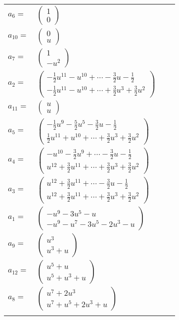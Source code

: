 \documentclass[1p]{elsarticle_modified}
\theoremstyle{definition}
\begin{document}
\begin{tabular}{m{7pt} m{180pt} m{7pt} m{180pt} }
\flushright $a_{6}=$&$\begin{pmatrix}1\\0\end{pmatrix}$ \\
\flushright $a_{10}=$&$\begin{pmatrix}0\\u\end{pmatrix}$ \\
\flushright $a_{7}=$&$\begin{pmatrix}1\\- u^2\end{pmatrix}$ \\
\flushright $a_{2}=$&$\begin{pmatrix}-\frac{1}{2} u^{11}- u^{10}+\cdots-\frac{3}{2} u-\frac{1}{2}\\-\frac{1}{2} u^{11}- u^{10}+\cdots+\frac{3}{2} u^3+\frac{3}{2} u^2\end{pmatrix}$ \\
\flushright $a_{11}=$&$\begin{pmatrix}u\\u\end{pmatrix}$ \\
\flushright $a_{5}=$&$\begin{pmatrix}-\frac{1}{2} u^9-\frac{5}{2} u^5-\frac{3}{2} u-\frac{1}{2}\\\frac{1}{2} u^{11}+u^{10}+\cdots+\frac{3}{2} u^3+\frac{3}{2} u^2\end{pmatrix}$ \\
\flushright $a_{4}=$&$\begin{pmatrix}- u^{10}-\frac{3}{2} u^9+\cdots-\frac{3}{2} u-\frac{1}{2}\\u^{12}+\frac{3}{2} u^{11}+\cdots+\frac{3}{2} u^3+\frac{3}{2} u^2\end{pmatrix}$ \\
\flushright $a_{3}=$&$\begin{pmatrix}u^{12}+\frac{3}{2} u^{11}+\cdots-\frac{3}{2} u-\frac{1}{2}\\u^{12}+\frac{3}{2} u^{11}+\cdots+\frac{3}{2} u^3+\frac{3}{2} u^2\end{pmatrix}$ \\
\flushright $a_{1}=$&$\begin{pmatrix}- u^9-3 u^5- u\\- u^9- u^7-3 u^5-2 u^3- u\end{pmatrix}$ \\
\flushright $a_{9}=$&$\begin{pmatrix}u^3\\u^3+u\end{pmatrix}$ \\
\flushright $a_{12}=$&$\begin{pmatrix}u^5+u\\u^5+u^3+u\end{pmatrix}$ \\
\flushright $a_{8}=$&$\begin{pmatrix}u^7+2 u^3\\u^7+u^5+2 u^3+u\end{pmatrix}$\\&\end{tabular}
\end{document}
